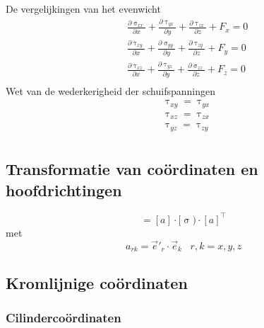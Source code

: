             De vergelijkingen van het evenwicht
            \begin{align}
                &\frac{\partial \upsigma_{xx}}{\partial x} + \frac{\partial \uptau_{yx}}{\partial y} + \frac{\partial \uptau_{zx}}{\partial z} + F_x = 0\nonumber\\
                &\frac{\partial \uptau_{xy}}{\partial x} + \frac{\partial \upsigma_{yy}}{\partial y} + \frac{\partial \uptau_{zy}}{\partial z} + F_y = 0 \\
                &\frac{\partial \uptau_{xz}}{\partial x} + \frac{\partial \uptau_{yz}}{\partial y} + \frac{\partial \upsigma_{zz}}{\partial z} + F_z = 0\nonumber\\
                \label{vergelijkingen_van_het_evenwicht}
            \end{align}
            Wet van de wederkerigheid der schuifspanningen
            \begin{align}
                &\uptau_{xy} = \uptau_{yx}\\
                &\uptau_{xz} = \uptau_{zx}\\
                &\uptau_{yz} = \uptau_{zy}\\
            \end{align}

        \subsection{Transformatie van coördinaten en hoofdrichtingen}

            \begin{equation}
                [\upsigma'] = [a]\cdot[\upsigma)\cdot[a]^{\top}
                \label{spanningstransformatie}
            \end{equation}
            met
            \begin{equation}
                a_{rk} = \vec{e}'_r\cdot\vec{e}_k \;\;\; r,k=x,y,z
                \label{Transformatiematrixelementen}
            \end{equation}
            
        \subsection{Kromlijnige coördinaten}
            
            \subsubsection{Cilindercoördinaten}

